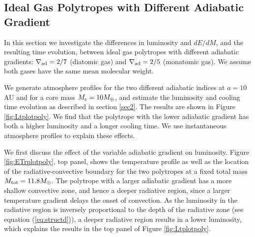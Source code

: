 \documentclass[apj]{emulateapj}
\newcommand{\delad}{\nabla_{\rm ad}}
\begin{document}
\subsection{Ideal Gas Polytropes with Different Adiabatic Gradient}
\label{deladpoly}

In this section we investigate the differences in luminosity and $dE/dM$, and the resulting time evolution, between ideal gas polytropes with different adiabatic gradients: $\delad=2/7$ (diatomic gas) and $\delad=2/5$ (monatomic gas). We assume both gases have the same mean molecular weight. %

We generate atmosphere profiles for the two different adiabatic indices at $a=10$ AU and for a core mass $M_{\rm c}=10 M_{\oplus}$, and estimate the luminosity and cooling time evolution as described in section \ref{sec2}. The results are shown in Figure \ref{fig:Ltplotpoly}. We find that the polytrope with the lower adiabatic gradient has both a higher luminosity and a longer cooling time. We use instantaneous atmosphere profiles to explain these effects. 

We first discuss the effect of the variable adiabatic gradient on luminosity. Figure \ref{fig:ETrplotpoly}, top panel, shows the temperature profile as well as the location of the radiative-convective boundary for the two polytropes at a fixed total mass $M_{\rm{tot}}=11.8 M_{\oplus}$. The polytrope with a larger adiabatic gradient has a more shallow convective zone, and hence a deeper radiative region, since a larger temperature gradient delays the onset of convection. As the luminosity in the radiative region is inversely proportional to the depth of the radiative zone (see equation (\ref{eq:structd})), a deeper radiative region results in a lower luminosity, which explains the results in the top panel of Figure \ref{fig:Ltplotpoly}. 
\end{document}
